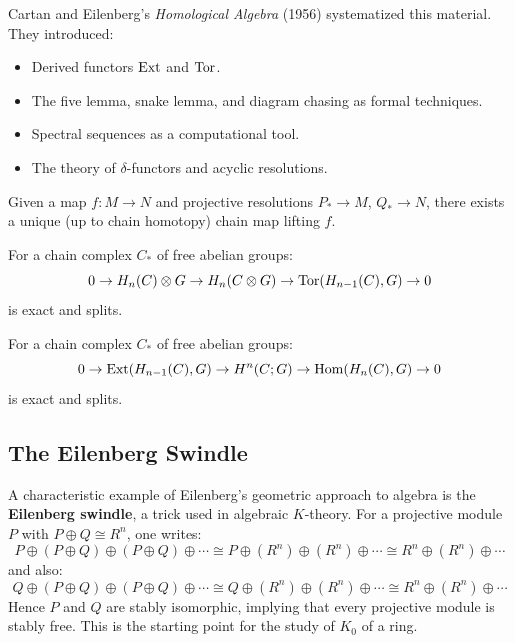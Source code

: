 Cartan and Eilenberg's \textit{Homological Algebra} (1956) systematized this material. They introduced:
\begin{itemize}
    \item Derived functors $\operatorname{Ext}$ and $\operatorname{Tor}$.
    \item The five lemma, snake lemma, and diagram chasing as formal techniques.
    \item Spectral sequences as a computational tool.
    \item The theory of $\delta$-functors and acyclic resolutions.
\end{itemize}

\begin{theorem}
Given a map $f: M \to N$ and projective resolutions $P_* \to M$, $Q_* \to N$, there exists a unique (up to chain homotopy) chain map lifting $f$.
\end{theorem}

\begin{theorem}
For a chain complex $C_*$ of free abelian groups:
\[
0 \to H_n(C) \otimes G \to H_n(C \otimes G) \to \operatorname{Tor}(H_{n-1}(C), G) \to 0
\]
is exact and splits.
\end{theorem}

\begin{theorem}
For a chain complex $C_*$ of free abelian groups:
\[
0 \to \operatorname{Ext}(H_{n-1}(C), G) \to H^n(C; G) \to \operatorname{Hom}(H_n(C), G) \to 0
\]
is exact and splits.
\end{theorem}

\subsection{The Eilenberg Swindle}

A characteristic example of Eilenberg's geometric approach to algebra is the \textbf{Eilenberg swindle}, a trick used in algebraic $K$-theory. For a projective module $P$ with $P \oplus Q \cong R^n$, one writes:
\[
P \oplus (P \oplus Q) \oplus (P \oplus Q) \oplus \cdots \cong P \oplus (R^n) \oplus (R^n) \oplus \cdots \cong R^n \oplus (R^n) \oplus \cdots
\]
and also:
\[
Q \oplus (P \oplus Q) \oplus (P \oplus Q) \oplus \cdots \cong Q \oplus (R^n) \oplus (R^n) \oplus \cdots \cong R^n \oplus (R^n) \oplus \cdots
\]
Hence $P$ and $Q$ are stably isomorphic, implying that every projective module is stably free. This is the starting point for the study of $K_0$ of a ring.

